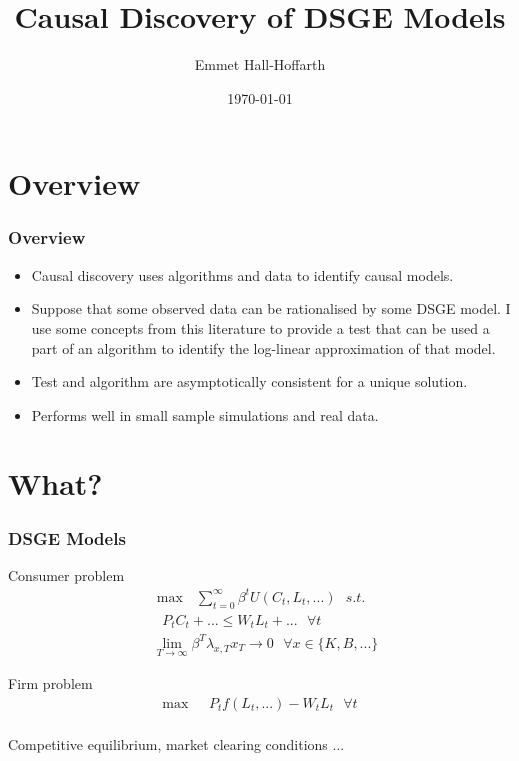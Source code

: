 \documentclass{beamer}
\title[Causal Discovery DSGE]{Causal Discovery of DSGE Models} %
\author{Emmet Hall-Hoffarth} %
\institute[Oxford] %
{
University of Oxford \\ %
\medskip
\textit{emmet.hall-hoffarth@economics.ox.ac.uk} %
}
\date{\today} %
\begin{document}
\begin{frame}
    \titlepage %
\end{frame}

\section{Overview}

\begin{frame}
    \frametitle{Overview}
    \begin{itemize}
        \item Causal discovery uses algorithms and data to identify causal models.
        \item Suppose that some observed data can be rationalised by some DSGE model. I use some concepts from this literature to provide a test that can be used a part of an algorithm to identify the log-linear approximation of that model.
        \item Test and algorithm are asymptotically consistent for a unique solution.
        \item Performs well in small sample simulations and real data.
    \end{itemize}
\end{frame}

\section{What?}

\begin{frame}
    \frametitle{DSGE Models}
    \begin{minipage}{0.4\textwidth}
        \centering
        Consumer problem
        \begin{align*}
            & \max \text{ } \sum_{t=0}^{\infty} \beta^t U(C_t, L_t, ...) \text{ } s.t. \\
            & \text{ } P_t C_t + ... \leq W_t L_t + ... \text{ } \forall t \\
            & \lim_{T \rightarrow \infty} \beta^T \lambda_{x,T} x_T \rightarrow 0 \text{ } \forall x \in \{K, B, ...\}
        \end{align*}
    \end{minipage}
    \begin{minipage}{0.4\textwidth}
        \centering
        Firm problem
        \begin{align*}
            \max \text{ } & P_t f(L_t, ...) - W_t L_t \text{ } \forall t \\
        \end{align*}
    \end{minipage}
    \vskip 1cm
    \centering
    Competitive equilibrium, market clearing conditions ...
\end{frame}
\end{document}
